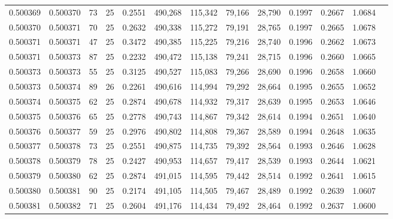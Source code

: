 \begin{tabular}{rrrrrrrrrrrrr}
0.500369 & 0.500370 &  73 &  25 &                                     0.2551 & 490,268 & 115,342 &  79,166 &  28,790 & 0.1997 & 0.2667 & 1.0684 \\
0.500370 & 0.500371 &  70 &  25 &                                     0.2632 & 490,338 & 115,272 &  79,191 &  28,765 & 0.1997 & 0.2665 & 1.0678 \\
0.500371 & 0.500371 &  47 &  25 &                                     0.3472 & 490,385 & 115,225 &  79,216 &  28,740 & 0.1996 & 0.2662 & 1.0673 \\
0.500371 & 0.500373 &  87 &  25 &                                     0.2232 & 490,472 & 115,138 &  79,241 &  28,715 & 0.1996 & 0.2660 & 1.0665 \\
0.500373 & 0.500373 &  55 &  25 &                                     0.3125 & 490,527 & 115,083 &  79,266 &  28,690 & 0.1996 & 0.2658 & 1.0660 \\
0.500373 & 0.500374 &  89 &  26 &                                     0.2261 & 490,616 & 114,994 &  79,292 &  28,664 & 0.1995 & 0.2655 & 1.0652 \\
0.500374 & 0.500375 &  62 &  25 &                                     0.2874 & 490,678 & 114,932 &  79,317 &  28,639 & 0.1995 & 0.2653 & 1.0646 \\
0.500375 & 0.500376 &  65 &  25 &                                     0.2778 & 490,743 & 114,867 &  79,342 &  28,614 & 0.1994 & 0.2651 & 1.0640 \\
0.500376 & 0.500377 &  59 &  25 &                                     0.2976 & 490,802 & 114,808 &  79,367 &  28,589 & 0.1994 & 0.2648 & 1.0635 \\
0.500377 & 0.500378 &  73 &  25 &                                     0.2551 & 490,875 & 114,735 &  79,392 &  28,564 & 0.1993 & 0.2646 & 1.0628 \\
0.500378 & 0.500379 &  78 &  25 &                                     0.2427 & 490,953 & 114,657 &  79,417 &  28,539 & 0.1993 & 0.2644 & 1.0621 \\
0.500379 & 0.500380 &  62 &  25 &                                     0.2874 & 491,015 & 114,595 &  79,442 &  28,514 & 0.1992 & 0.2641 & 1.0615 \\
0.500380 & 0.500381 &  90 &  25 &                                     0.2174 & 491,105 & 114,505 &  79,467 &  28,489 & 0.1992 & 0.2639 & 1.0607 \\
0.500381 & 0.500382 &  71 &  25 &                                     0.2604 & 491,176 & 114,434 &  79,492 &  28,464 & 0.1992 & 0.2637 & 1.0600 \\

\end{tabular}
